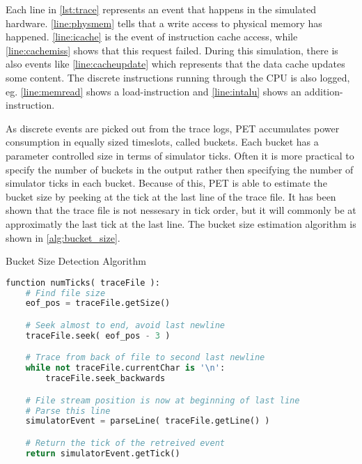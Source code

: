 Each line in \autoref{lst:trace} represents an event that happens in the
simulated hardware.  \autoref{line:physmem} tells that a write access to
physical memory has happened. \autoref{line:icache} is the event of instruction
cache access, while \autoref{line:cachemiss} shows that this request failed.
During this simulation, there is also events like \autoref{line:cacheupdate}
which represents that the data cache updates some content. The discrete
instructions running through the CPU is also logged, eg. \autoref{line:memread}
shows a load-instruction and \autoref{line:intalu} shows an
addition-instruction.

As discrete events are picked out from the trace logs, PET accumulates power
consumption in equally sized timeslots, called buckets. Each bucket has a
parameter controlled size in terms of simulator ticks. Often it is more
practical to specify the number of buckets in the output rather then specifying
the number of simulator ticks in each bucket. Because of this, PET is able to
estimate the bucket size by peeking at the tick at the last line of the trace
file. It has been shown that the trace file is not nessesary in tick order,
but it will commonly be at approximatly the last tick at the last line. The
bucket size estimation algorithm is shown in \autoref{alg:bucket_size}.

\begin{algorithm}
    \caption{Bucket Size Detection Algorithm}
    \label{alg:bucket_size}
%
    \begin{lstlisting}[language=Python]
function numTicks( traceFile ):
    # Find file size
    eof_pos = traceFile.getSize()

    # Seek almost to end, avoid last newline
    traceFile.seek( eof_pos - 3 )

    # Trace from back of file to second last newline
    while not traceFile.currentChar is '\n':
        traceFile.seek_backwards

    # File stream position is now at beginning of last line
    # Parse this line
    simulatorEvent = parseLine( traceFile.getLine() )

    # Return the tick of the retreived event
    return simulatorEvent.getTick()
    \end{lstlisting}
\end{algorithm}

